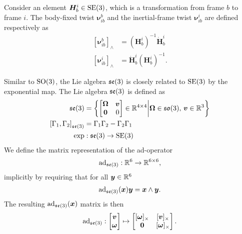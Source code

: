 Consider an element $\bm{H}_{b}^i \in \operatorname{SE}(3)$, which is a transformation from frame
$b$ to frame $i$. The body-fixed twist $\bm{\nu}_{ib}^b$ and the inertial-frame
twist $\bm{\nu}_{ib}^i$ are defined respectively as
\begin{subequations}
\begin{align}
    [\bm{\nu}_{ib}^b]_{\wedge} &= \left(\bm{H}_{b}^i\right)^{-1}\dot{\bm{H}}_{b}^i \label{eq:body_twist_def}\\
    [\bm{\nu}_{ib}^i]_{\wedge} &= \dot{\bm{H}}_{b}^i \left(\bm{H}_{b}^i\right)^{-1}. 
\end{align}
\end{subequations}

Similar to $\operatorname{SO}(3)$, the Lie algebra $\mathfrak{se}(3)$ is closely related to $\operatorname{SE}(3)$ by the exponential
map. The Lie algebra $\mathfrak{se}(3)$ is defined as
\begin{subequations}
    \label{eq:se3_algebra}
\begin{align}
    \mathfrak{se}(3) &= \left\{ \begin{bmatrix}
        \bm{\Omega} & \bm{v} \\
        \bm{0} & 0
    \end{bmatrix}
    \in \mathbb{R}^{4 \times 4}
    \middle|
    \bm{\Omega} \in \mathfrak{so}(3), \, \bm{v} \in \mathbb{R}^3
    \right\} \\
    \left[ \Gamma_1, \Gamma_2 \right]_{\mathfrak{se}(3)} &= \Gamma_1 \Gamma_2 - \Gamma_2 \Gamma_1 \\
    \exp &: \mathfrak{se}(3) \to \operatorname{SE}(3)
\end{align}
\end{subequations}
We define the matrix representation of the ad-operator
\begin{align}
    \operatorname{ad}_{\mathfrak{se}(3)} : \mathbb{R}^6 \to \mathbb{R}^{6 \times 6},
\end{align}
implicitly by requiring that for all $\bm{y} \in \mathbb{R}^6$
\begin{align}
    \operatorname{ad}_{\mathfrak{se}(3)}( \bm{x} ) \bm{y} = \bm{x} \wedge \bm{y}. \label{eq:ad_impl}
\end{align}
The resulting $\operatorname{ad}_{\mathfrak{se}(3)}(\bm{x})$ matrix is then
\begin{align}
    \operatorname{ad}_{\mathfrak{se}(3)} : \begin{bmatrix} \bm{v} \\ \bm{\omega} \end{bmatrix}
        \mapsto \begin{bmatrix}
            [\bm{\omega}]_{\times} & [\bm{v}]_{\times} \\
            \bm{0} & [\bm{\omega}]_{\times}
        \end{bmatrix}.
\end{align}
